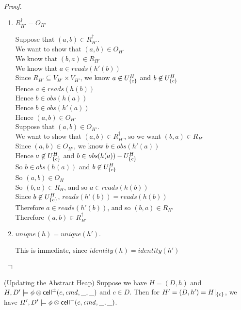 \begin{proof}
\begin{enumerate}
\item $R^\dagger_{H'} = O_{H'}$ 
  \begin{tabbedproof}
    \oo Suppose that $(a, b) \in R^\dagger_{H'}$. \\
    \ooo We want to show that $(a, b) \in O_{H'}$ \\
    \ooo We know that $(b, a) \in R_{H'}$ \\
    \ooo We know that $a \in \mathit{reads}(h'(b))$ \\
    \ooo Since $R_{H'} \subseteq V_{H'} \times V_{H'}$, we know $a \not\in U^H_{\{{c}\}}$ and $b \not \in U^H_{\{{c}\}}$ \\
    \ooo Hence $a \in \mathit{reads}(h(b))$ \\ 
    \ooo Hence $b \in \mathit{obs}(h(a))$ \\
    \ooo Hence $b \in \mathit{obs}(h'(a))$ \\
    \ooo Hence $(a,b) \in O_{H'}$ \\
    \oo Suppose that $(a, b) \in O_{H'}$. \\
    \ooo We want to show that $(a,b) \in R^\dagger_{H'}$, so we want $(b,a) \in R_{H'}$ \\
    \ooo Since $(a,b) \in O_{H'}$, we know $b \in \mathit{obs}(h'(a))$ \\
    \ooo Hence $a \not\in U^H_{\{{c}\}}$ and $b \in \mathit{obs}(h(a)) - U^H_{\{{c}\}}$ \\
    \ooo So $b \in \mathit{obs}(h(a))$ and $b \not \in U^H_{\{{c}\}}$ \\
    \ooo So $(a,b) \in O_H$ \\
    \ooo So $(b,a) \in R_H$, and so $a \in \mathit{reads}(h(b))$ \\
    \ooo Since $b \not\in U^H_{\{{c}\}}$, $\mathit{reads}(h'(b)) = \mathit{reads}(h(b))$ \\
    \ooo Therefore $a \in \mathit{reads}(h'(b))$, and so $(b,a) \in R_{H'}$ \\
    \ooo Therefore $(a,b) \in R^\dagger_{H'}$ 
  \end{tabbedproof}

\item $\mathit{unique}(h) = \mathit{unique}(h')$.

This is immediate, since $\mathit{identity}(h) = \mathit{identity}(h')$ 
\end{enumerate}
\end{proof}


\begin{lemma}{(Updating the Abstract Heap)}
Suppose we have $H = (D,h)$ and $H, D' \models \phi \otimes
\mathsf{cell}^{\pm}({c}, {\mathit{cmd}}, {\_}, {\_})$ and $c \in D$. Then for $H' = (D, h') = H|_{\{{c}\}}$, we
have $H', D' \models \phi \otimes \mathsf{cell}^{-}({c}, {\mathit{cmd}}, {\_}, {\_})$.
\end{lemma}

